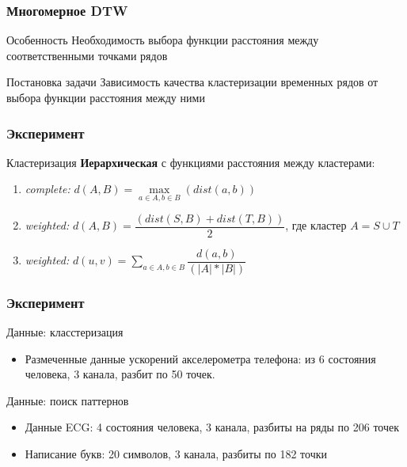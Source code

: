 \documentclass{beamer}
\begin{document}

\begin{frame}
\frametitle{Многомерное DTW}    
    \begin{block}{Особенность}
        Необходимость выбора функции расстояния между соответственными точками рядов
    \end{block}

    \begin{block}{Постановка задачи}
        Зависимость качества кластеризации временных рядов от выбора функции расстояния между ними
    \end{block}
\end{frame}
        

\begin{frame}
    \frametitle{Эксперимент}
    \begin{block}{Кластеризация}
        \textbf{Иерархическая} с функциями расстояния между кластерами: 
        \begin{enumerate}
            \item \textit{complete:}  $d(A, B) = \max\limits_{a \in A, b \in B}(dist(a, b))$ 
            \item \textit{weighted:}  $d(A,B) = \dfrac{(dist(S,B) + dist(T,B))}{2}$, где кластер $A = S \cup T$
            \item \textit{weighted:}  $d(u,v) = \sum\limits_{a \in A, b \in B} \dfrac{d(a, b)}{(|A|*|B|)}$ 
        \end{enumerate} 
    \end{block}
\end{frame}
 
\begin{frame}
    \frametitle{Эксперимент}   
    \begin{block}{Данные: класстеризация}
        \begin{itemize}
            \item Размеченные данные ускорений акселерометра телефона: из 6 состояния человека,
                3 канала, разбит по 50 точек.
        \end{itemize}
    \end{block}

    \begin{block}{Данные: поиск паттернов}
        \begin{itemize}
            \item Данные ECG: 4 состояния человека, 3 канала, разбиты на ряды по 206 точек
            \item Написание букв: 20 символов, 3 канала, разбиты по 182 точки 
        \end{itemize}
    \end{block}
\end{frame}
    
\end{document}
